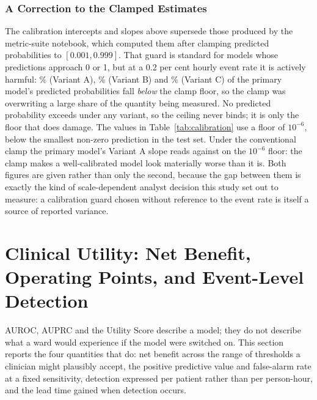 \subsubsection{A Correction to the Clamped Estimates}

The calibration intercepts and slopes above supersede those produced by the
metric-suite notebook, which computed them after clamping predicted
probabilities to $[0.001, 0.999]$. That guard is standard for models whose
predictions approach 0 or 1, but at a 0.2 per cent hourly event rate it is
actively harmful: \pcPctBelowClampPrimaryA\% (Variant A),
\pcPctBelowClampPrimaryB\% (Variant B) and \pcPctBelowClampPrimaryC\%
(Variant C) of the primary model's predicted probabilities fall \emph{below}
the clamp floor, so the clamp was overwriting a large share of the quantity
being measured. No predicted probability exceeds \pcMaxPredPrimaryC{} under any
variant, so the
ceiling never binds; it is only the floor that does damage. The
values in Table~\ref{tab:calibration} use a floor of $10^{-6}$, below the
smallest non-zero prediction in the test set. Under the conventional clamp the primary
model's Variant A slope reads \pcCalibSlopeClampedPrimaryA{} against
\pcCalibSlopePrimaryA{} on the
$10^{-6}$ floor: the clamp makes a well-calibrated model look materially
worse than it is. Both figures are given rather than only the second, because
the gap between them is exactly the kind of scale-dependent analyst decision
this study set out to measure: a calibration guard chosen without reference to
the event rate is itself a source of reported variance.



\section{Clinical Utility: Net Benefit, Operating Points, and Event-Level
    Detection}
\label{sec:clinical_utility}

AUROC, AUPRC and the Utility Score describe a model; they do not describe what
a ward would experience if the model were switched on. This section reports
the four quantities that do: net benefit across the range of thresholds a
clinician might plausibly accept, the positive predictive value and false-alarm
rate at a fixed sensitivity, detection expressed per patient rather than per
person-hour, and the lead time gained when detection occurs.

